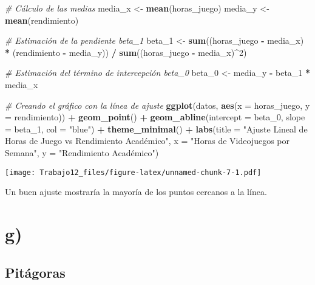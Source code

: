 \documentclass[
]{article}
\newenvironment{Shaded}{\begin{snugshade}}{\end{snugshade}}
\newcommand{\AttributeTok}[1]{\textcolor[rgb]{0.13,0.29,0.53}{#1}}
\newcommand{\CommentTok}[1]{\textcolor[rgb]{0.56,0.35,0.01}{\textit{#1}}}
\newcommand{\DecValTok}[1]{\textcolor[rgb]{0.00,0.00,0.81}{#1}}
\newcommand{\FunctionTok}[1]{\textcolor[rgb]{0.13,0.29,0.53}{\textbf{#1}}}
\newcommand{\NormalTok}[1]{#1}
\newcommand{\OtherTok}[1]{\textcolor[rgb]{0.56,0.35,0.01}{#1}}
\newcommand{\SpecialCharTok}[1]{\textcolor[rgb]{0.81,0.36,0.00}{\textbf{#1}}}
\newcommand{\StringTok}[1]{\textcolor[rgb]{0.31,0.60,0.02}{#1}}
\begin{document}
\begin{Shaded}
\begin{Highlighting}[]
\CommentTok{\# Cálculo de las medias}
\NormalTok{media\_x }\OtherTok{\textless{}{-}} \FunctionTok{mean}\NormalTok{(horas\_juego)}
\NormalTok{media\_y }\OtherTok{\textless{}{-}} \FunctionTok{mean}\NormalTok{(rendimiento)}

\CommentTok{\# Estimación de la pendiente beta\_1}
\NormalTok{beta\_1 }\OtherTok{\textless{}{-}} \FunctionTok{sum}\NormalTok{((horas\_juego }\SpecialCharTok{{-}}\NormalTok{ media\_x) }\SpecialCharTok{*}\NormalTok{ (rendimiento }\SpecialCharTok{{-}}\NormalTok{ media\_y)) }\SpecialCharTok{/} \FunctionTok{sum}\NormalTok{((horas\_juego }\SpecialCharTok{{-}}\NormalTok{ media\_x)}\SpecialCharTok{\^{}}\DecValTok{2}\NormalTok{)}

\CommentTok{\# Estimación del término de intercepción beta\_0}
\NormalTok{beta\_0 }\OtherTok{\textless{}{-}}\NormalTok{ media\_y }\SpecialCharTok{{-}}\NormalTok{ beta\_1 }\SpecialCharTok{*}\NormalTok{ media\_x}

\CommentTok{\# Creando el gráfico con la línea de ajuste}
\FunctionTok{ggplot}\NormalTok{(datos, }\FunctionTok{aes}\NormalTok{(}\AttributeTok{x =}\NormalTok{ horas\_juego, }\AttributeTok{y =}\NormalTok{ rendimiento)) }\SpecialCharTok{+}
  \FunctionTok{geom\_point}\NormalTok{() }\SpecialCharTok{+}
  \FunctionTok{geom\_abline}\NormalTok{(}\AttributeTok{intercept =}\NormalTok{ beta\_0, }\AttributeTok{slope =}\NormalTok{ beta\_1, }\AttributeTok{col =} \StringTok{"blue"}\NormalTok{) }\SpecialCharTok{+}
  \FunctionTok{theme\_minimal}\NormalTok{() }\SpecialCharTok{+}
  \FunctionTok{labs}\NormalTok{(}\AttributeTok{title =} \StringTok{"Ajuste Lineal de Horas de Juego vs Rendimiento Académico"}\NormalTok{,}
       \AttributeTok{x =} \StringTok{"Horas de Videojuegos por Semana"}\NormalTok{,}
       \AttributeTok{y =} \StringTok{"Rendimiento Académico"}\NormalTok{)}
\end{Highlighting}
\end{Shaded}

\texttt{[image: Trabajo12\_files/figure-latex/unnamed-chunk-7-1.pdf]}

Un buen ajuste mostraría la mayoría de los puntos cercanos a la línea.

\hypertarget{g}{%
\section{g)}\label{g}}

\hypertarget{pituxe1goras}{%
\subsection{Pitágoras}\label{pituxe1goras}}
\end{document}
